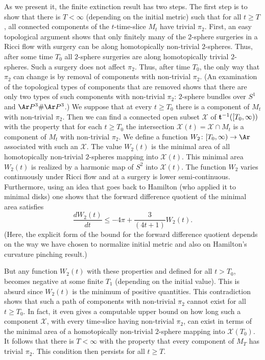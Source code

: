 As we present it, the finite extinction result has two steps. The
first step is to show that there is $T<\infty$ (depending on the
initial metric) such that for all $t\ge T$, all connected components
of the $t$-time-slice $M_t$ have trivial $\pi_2$.  First, an easy
topological argument shows that only finitely many of the $2$-sphere
surgeries in a Ricci flow with surgery can be along homotopically
non-trivial $2$-spheres. Thus, after some time $T_0$ all $2$-sphere
surgeries are along homotopically trivial $2$-spheres. Such a
surgery does not affect $\pi_2$. Thus, after time $T_0$, the only
way that $\pi_2$ can change is by removal of components with
non-trivial $\pi_2$. (An examination of the topological types of
components that are removed shows that there are only two types of
such components with non-trivial $\pi_2$: $2$-sphere bundles over
$S^1$ and $\Ar P^3\#\Ar P^3$.) We suppose that at every $t\ge T_0$
there is a component of $M_t$ with non-trivial $\pi_2$. Then we can
find a connected open subset ${\mathcal X}$ of ${\bf
t}^{-1}([T_0,\infty))$ with the property that for each $t\ge  T_0$
the intersection ${\mathcal X}(t)= {\mathcal X}\cap M_t$ is a
component of $M_t$ with non-trivial $\pi_2$. We define a function
$W_2\colon [T_0,\infty)\to \Ar$ associated with such an ${\mathcal
X}$. The value $W_2(t)$ is the minimal area of all homotopically
non-trivial $2$-spheres mapping into ${\mathcal X}(t)$. This minimal
area $W_2(t)$ is realized by a harmonic map of $S^2$ into ${\mathcal
X}(t)$. The function $W_2$ varies continuously under Ricci flow and
at a surgery is lower semi-continuous. Furthermore, using an idea
that goes back to Hamilton (who applied it to minimal disks) one
shows that the forward difference quotient of the minimal area
satisfies
$$\frac{dW_2(t)}{dt}\le -4\pi +\frac{3}{(4t+1)}W_2(t).$$
(Here, the explicit form of the bound for the forward difference
quotient depends on the way we have chosen to normalize initial
metric and also on Hamilton's curvature pinching result.)

But any function $W_2(t)$ with these properties and defined for all
$t>T_0$,  becomes negative at some finite $T_1$ (depending on the
initial value). This is absurd since $W_2(t)$ is the minimum of
positive quantities. This contradiction shows that such a path of
components with non-trivial $\pi_2$ cannot exist for all $t\ge T_0$.
In fact, it even gives a computable upper bound on how long such a
component ${\mathcal X}$, with every time-slice having non-trivial
$\pi_2$, can exist in terms of the minimal area of a homotopically
non-trivial $2$-sphere mapping into ${\mathcal X}(T_0)$. It follows
that there is $T<\infty$ with the property that every component of
$M_T$ has trivial $\pi_2$. This condition then persists for all
$t\ge T$.

